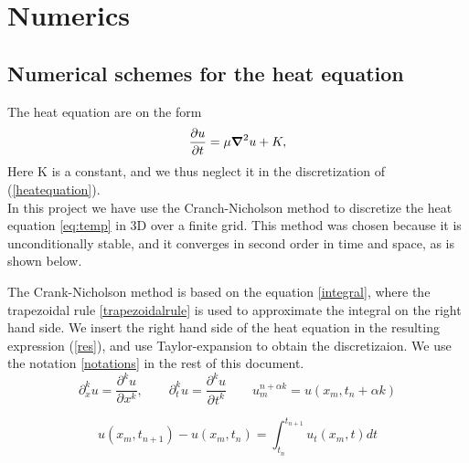 \chapter{Numerics}

\section{Numerical schemes for the heat equation}

The heat equation are on the form
\begin{equation}
\frac{\partial u}{\partial t}=\mu \mbox{\boldmath$ \nabla $} ^2 u + K,
\label{heatequation}
\end{equation}
Here K is a constant, and we thus neglect it in the discretization of (\ref{heatequation}).\\

In this project we have use the Cranch-Nicholson method to discretize the heat
equation \cref{eq:temp} in 3D over a finite grid. This method was chosen because
it is unconditionally stable, and it converges in second order in time and space, as is shown below.


The Crank-Nicholson method is based on the equation \cref{integral}, where the trapezoidal rule \cref{trapezoidalrule} is used to approximate the integral on the right hand side. We insert the right hand side of the heat equation in the resulting expression (\ref{res}), and use Taylor-expansion to obtain the discretizaion. We use the notation \cref{notations} in the rest of this document.
\begin{equation}
\partial_{x}^{k}u=\frac{\partial^{k}u}{\partial^{}x^{k}},\quad \quad \partial_{t}^{k}u=\frac{\partial^{k}u}{\partial^{}t^{k}} \quad \quad u_{m}^{n+\alpha k } = u(x_{m},t_{n}+\alpha k)
\label{notations}
\end{equation}

\begin{equation}
u(x_m,t_{n+1}) - u(x_m,t_n) = \int_{t_n} ^{t_{n+1}} u_t(x_m,t) dt
\label{integral}
\end{equation}

